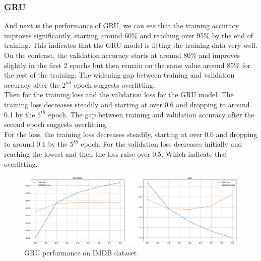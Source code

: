 \documentclass[12pt,a4paper]{article}
\begin{document}
\subsubsection{GRU}
And next is the performance of GRU, we can see that the training accuracy improves significantly, starting around 60\% and reaching over 95\% by the end of training. This indicates that the GRU model is fitting the training data very well. On the contrast, the validation accuracy starts at around 80\% and improves slightly in the first 2 epochs but then remain on the same value around 85\% for the rest of the training. The widening gap between training and validation accuracy after the $2^{nd}$ epoch suggests overfitting. 
\\[1ex]
Then for the training loss and the validation loss for the GRU model. The training loss decreases steadily and starting at over 0.6 and dropping to around 0.1 by the $5^{th}$ epoch. The gap between training and validation accuracy after the second epoch suggests overfitting.
\\[1ex]
For the loss, the training loss decreases steadily, starting at over 0.6 and dropping to around 0.1 by the $5^{th}$ epoch. For the validation loss decreases initially and reaching the lowest and then the loss raise over 0.5. Which indicate that overfitting.
\begin{figure}[h!]
    \centering
    \includegraphics[width=1\textwidth]{../Pic/gru_performance.png} 
    \caption{GRU performance on IMDB dataset}
\end{figure}
\end{document}
